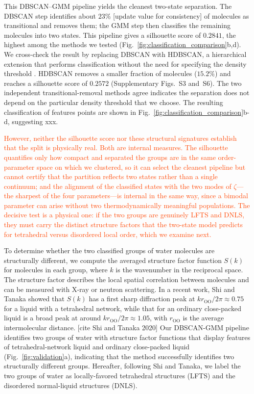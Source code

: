\documentclass[aps, amsmath,amssymb, reprint, twocolumn, superscriptaddress]{revtex4-2}
\newcommand{\comment}[1]{\textcolor{Mahogany}{#1}}
\newcommand{\edit}[1]{\textcolor{OrangeRed}{#1}}
\begin{document}
This DBSCAN--GMM pipeline yields the cleanest two-state separation. The DBSCAN step identifies about $23\%$ \comment{[update value for consistency]} of molecules as transitional and removes them; the GMM step then classifies the remaining molecules into two states. This pipeline gives a silhouette score of $0.2841$, the highest among the methods we tested (Fig.~\ref{fig:classification_comparison}b,d). We cross-check the result by replacing DBSCAN with HDBSCAN, a hierarchical extension that performs classification without the need for specifying the density threshold \cite{mcinnes_hdbscan_2017,malzer_hybrid_2020}. HDBSCAN removes a smaller fraction of molecules ($15.2\%$) and reaches a silhouette score of $0.2572$ (Supplementary Figs.~S3 and~S6). The two independent transitional-removal methods agree indicates the separation does not depend on the particular density threshold that we choose. The resulting classification of features points are shown in Fig.~\ref{fig:classification_comparison}b-d, suggesting xxx.

\edit{However, neither the silhouette score nor these structural signatures establish that the split is physically real. Both are internal measures. The silhouette quantifies only how compact and separated the groups are in the same order-parameter space on which we clustered, so it can select the cleanest pipeline but cannot certify that the partition reflects two states rather than a single continuum; and the alignment of the classified states with the two modes of $\zeta$---the sharpest of the four parameters---is internal in the same way, since a bimodal parameter can arise without two thermodynamically meaningful populations. The decisive test is a physical one: if the two groups are genuinely LFTS and DNLS, they must carry the distinct structure factors that the two-state model predicts for tetrahedral versus disordered local order, which we examine next.}

To determine whether the two classified groups of water molecules are structurally different,  we compute the averaged structure factor function $S(k)$ for molecules in each group, where $k$ is the wavenumber in the reciprocal space. The structure factor describes the local spatial correlation between molecules and can be measured with X-ray or neutron scattering. In a recent work, Shi and Tanaka showed that $S(k)$ has a first sharp diffraction peak at $kr_\text{OO}/2\pi \approx 0.75$ for a liquid with a tetrahedral network, while that for an ordinary close-packed liquid is a broad peak at around $kr_\text{OO}/2\pi \approx 1.05$, with  $r_\text{OO}$ is the average intermolecular distance. \comment{[cite Shi and Tanaka 2020]} Our DBSCAN-GMM pipeline identifies two groups of water with structure factor functions that display features of tetrahedral-network liquid and ordinary close-packed liquid (Fig.~\ref{fig:validation}a), indicating that the method successfully identifies two structurally different groups. Hereafter, following Shi and Tanaka, we label the two groups of water as locally-favored tetrahedral structures (LFTS) and the disordered normal-liquid structures (DNLS). 
\end{document}
